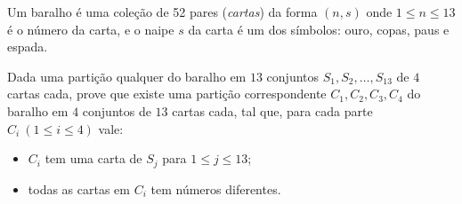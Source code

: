 Um baralho é uma coleção de 52 pares (\emph{cartas}) da forma $(n, s)$ onde $1 \le n \le 13$ é o número da carta, e o naipe $s$ da carta é um dos símbolos: ouro, copas, paus e espada.

Dada uma partição qualquer do baralho em $13$ conjuntos $S_1, S_2, \dots, S_{13}$ de $4$ cartas cada, prove que existe uma partição correspondente $C_1, C_2, C_3, C_4$ do baralho em $4$ conjuntos de $13$ cartas cada, tal que, para cada parte $C_i\ (1 \le i \le 4)$ vale:

\begin{itemize}
	\item $C_i$ tem uma carta de $S_j$ para $1 \le j \le 13$;
	\item todas as cartas em $C_i$ tem números diferentes.
\end{itemize}
